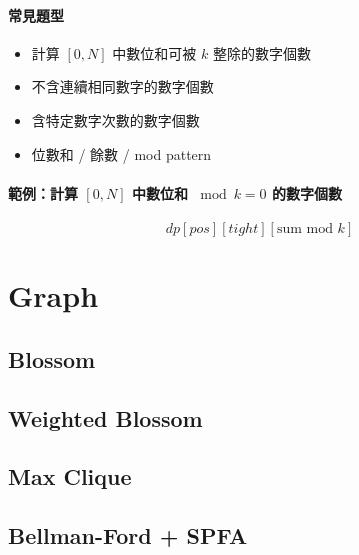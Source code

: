 \documentclass[a4paper,10pt,twocolumn,oneside]{article}
\begin{document}
\paragraph{常見題型}
\begin{itemize}[nolistsep]
    \item 計算 $[0,N]$ 中數位和可被 $k$ 整除的數字個數
    \item 不含連續相同數字的數字個數
    \item 含特定數字次數的數字個數
    \item 位數和 / 餘數 / mod pattern
\end{itemize}

\paragraph{範例：計算 $[0,N]$ 中數位和 $\bmod k = 0$ 的數字個數}

\[
    dp[pos][tight][\text{sum mod } k]
\]




\section{Graph}

\subsection{Blossom}


\subsection{Weighted Blossom}


\subsection{Max Clique}


% 

\subsection{Bellman-Ford + SPFA}

\end{document}
